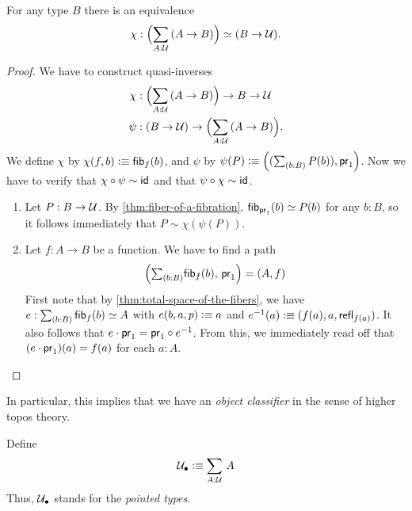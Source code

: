\begin{thm}\label{thm:nobject-classifier-appetizer}
For any type $B$ there is an equivalence
\begin{equation*}
\chi:\Parens{\sm{A:\type} (A\to B)}\simeq (B\to\type).
\end{equation*}
\end{thm}
\begin{proof}
We have to construct quasi-inverses
\begin{align*}
\chi & : \Parens{\sm{A:\type} (A\to B)}\to B\to\type\\
\psi & : (B\to\type)\to\Parens{\sm{A:\type} (A\to B)}.
\end{align*}
We define $\chi$ by $\chi(f,b)\vcentcolon\equiv{\mathsf{fib}}_{f}(b)$, and $\psi$ by $\psi(P)\defeq\Pairr{(\sm{b:B} P(b)),\proj1}$.
Now we have to verify that $\chi\circ\psi\sim\mathsf{id}_{}{}$ and that $\psi\circ\chi \sim\mathsf{id}_{}{}$.
\begin{enumerate}
\item Let $P:B\to\mathcal{U}$.
  By \autoref{thm:fiber-of-a-fibration},
${\mathsf{fib}}_{\mathsf{pr}_{1}}(b)\simeq P(b)$ for any $b:B$, so it follows immediately
that $P\sim\chi(\psi(P))$.
\item Let $f:A\to B$ be a function. We have to find a path
\begin{equation*}
\Pairr{\tsm{b:B} \hfiber{f}b,\,\proj1}=\pairr{A,f}
\end{equation*}
First note that by \autoref{thm:total-space-of-the-fibers}, we have
$e:\sm{b:B} \hfiber{f}b\simeq A$ with $e(b,a,p)\vcentcolon\equiv a$ and $e^{-1}(a)
\vcentcolon\equiv(f(a),a,\mathsf{refl}_{f(a)})$. It also follows that
$e\cdot\mathsf{pr}_{1}=\mathsf{pr}_{1}\circ e^{-1}$. From this, we immediately read off
that $(e\cdot\mathsf{pr}_{1})(a)= f(a)$ for each $a:A$.\qedhere
\end{enumerate}
\end{proof}

\noindent
In particular, this implies that we have an \emph{object classifier} in the sense of higher topos theory.

\begin{defn}
Define
\begin{equation*}
\pointed{\type}\defeq\sm{A:\type} A
\end{equation*}
Thus, $\mathcal{U}_\bullet$ stands for the \emph{pointed types}.
\end{defn}

